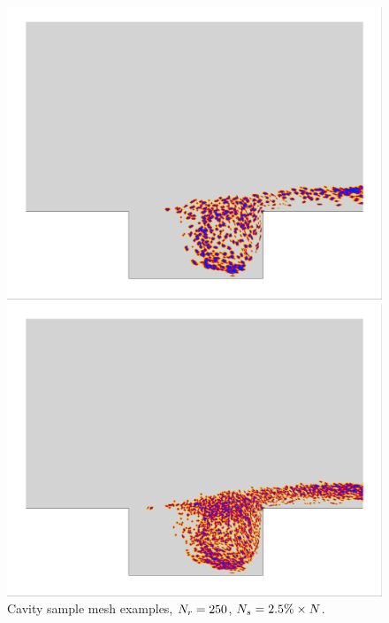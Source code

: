 \begin{figure}
	\begin{minipage}{0.49\linewidth}
		\includegraphics[width=0.99\linewidth,trim={0.5em 0.5em 0.5em 0.5em},clip]{Chapters/HPROMResults/Images/cavity/deim/iBlank_greedy_carlberg_zoom.png}
	\end{minipage}
	\begin{minipage}{0.49\linewidth}
		\includegraphics[width=0.99\linewidth,trim={0.5em 0.5em 0.5em 0.5em},clip]{Chapters/HPROMResults/Images/cavity/deim/iBlank_greedy_ben_zoom.png}
	\end{minipage}
	\caption{\label{fig:cavityiBlank}Cavity sample mesh examples, $N_r= 250$, $N_s = 2.5\% \times N$.}
\end{figure}

